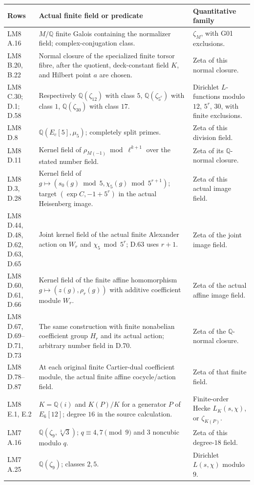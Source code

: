 \documentclass[11pt,a4paper]{article}
\begin{document}
\begin{longtable}{p{.22\linewidth}p{.43\linewidth}p{.26\linewidth}}
\hline
Rows & Actual finite field or predicate & Quantitative family\\
\hline
\endhead
LM8 A.16 & $M/\mathbb Q$ finite Galois containing the normalizer field;
complex-conjugation class. & $\zeta_M$, with G01 exclusions.\\[3pt]
LM8 B.20, B.22 & Normal closure of the specialized finite torsor fibre,
after the quotient, deck-constant field $K$, and Hilbert point $a$
are chosen. & Zeta of this normal closure.\\[3pt]
LM8 C.30; D.1; D.58 & Respectively
$\mathbb Q(\zeta_{12})$ with class $5$,
$\mathbb Q(\zeta_{5^r})$ with class $1$,
$\mathbb Q(\zeta_{30})$ with class $17$. & Dirichlet $L$-functions
modulo $12$, $5^r$, $30$, with finite exclusions.\\[3pt]
LM8 D.8 & $\mathbb Q(E_c[5],\mu_5)$; completely split primes.
& Zeta of this division field.\\[3pt]
LM8 D.11 & Kernel field of
$\rho_{M(-1)}\bmod\ell^{k+1}$ over the stated number field.
& Zeta of its $\mathbb Q$-normal closure.\\[3pt]
LM8 D.3, D.28 & Kernel field of
$g\mapsto(s_0(g)\bmod5,\chi_5(g)\bmod5^{r+1})$;
target $(\exp C,-1+5^r)$ in the actual Heisenberg image.
& Zeta of this actual image field.\\[3pt]
LM8 D.44, D.48, D.62, D.63, D.65 & Joint kernel field of the actual
finite Alexander action on $W_r$ and $\chi_5\bmod5^r$;
D.63 uses $r+1$. & Zeta of the joint image field.\\[3pt]
LM8 D.60, D.61, D.66 & Kernel field of the finite affine homomorphism
$g\mapsto(z(g),\rho_r(g))$ with additive coefficient module $W_r$.
& Zeta of the actual affine image field.\\[3pt]
LM8 D.67, D.69--D.71, D.73 & The same construction with finite
nonabelian coefficient group $H_r$ and its actual action;
arbitrary number field in D.70. & Zeta of the $\mathbb Q$-normal closure.\\[3pt]
LM8 D.78--D.87 & At each original finite Cartier-dual coefficient
module, the actual finite affine cocycle/action field.
& Zeta of that finite field.\\[3pt]
LM8 E.1, E.2 & $K=\mathbb Q(i)$ and $K(P)/K$ for a generator
$P$ of $E_6[12]$; degree $16$ in the source calculation.
& Finite-order Hecke $L_K(s,\chi)$, or $\zeta_{K(P)}$.\\[3pt]
LM7 A.16 & $\mathbb Q(\zeta_9,\sqrt[3]3)$;
$q\equiv4,7\pmod9$ and $3$ noncubic modulo $q$.
& Zeta of this degree-$18$ field.\\[3pt]
LM7 A.25 & $\mathbb Q(\zeta_9)$; classes $2,5$.
& Dirichlet $L(s,\chi)$ modulo $9$.\\
\bottomrule[0.4pt]
\end{longtable}
\end{document}
